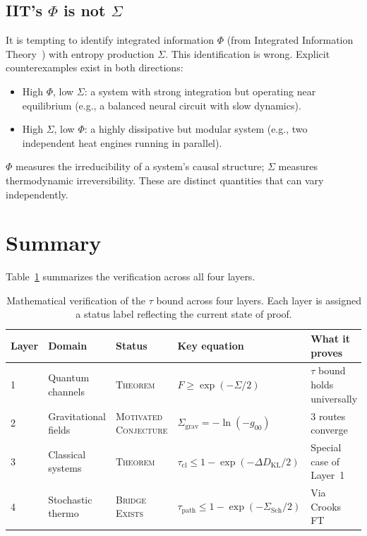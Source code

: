 \documentclass[prl,twocolumn,superscriptaddress,longbibliography,floatfix]{revtex4-2}
\newcommand{\tauasym}{\tau}
\begin{document}
\subsection{IIT's $\Phi$ is not $\Sigma$}

It is tempting to identify integrated information $\Phi$
(from Integrated Information Theory~\cite{Tononi2008}) with
entropy production $\Sigma$. This identification is wrong.
Explicit counterexamples exist in both directions:
\begin{itemize}
\item High $\Phi$, low $\Sigma$: a system with strong integration
but operating near equilibrium (e.g., a balanced neural circuit
with slow dynamics).
\item High $\Sigma$, low $\Phi$: a highly dissipative but modular
system (e.g., two independent heat engines running in parallel).
\end{itemize}
$\Phi$ measures the irreducibility of a system's causal structure;
$\Sigma$ measures thermodynamic irreversibility. These are distinct
quantities that can vary independently.

\section{Summary}
\label{sec:summary}

Table~\ref{tab:summary} summarizes the verification across all four
layers.

\begin{table}[t]
\caption{Mathematical verification of the $\tauasym$ bound across
four layers. Each layer is assigned a status label reflecting the
current state of proof.}
\label{tab:summary}
\begin{ruledtabular}
\begin{tabular}{lllll}
\textbf{Layer} & \textbf{Domain} & \textbf{Status}
& \textbf{Key equation} & \textbf{What it proves} \\
\hline
1 & Quantum channels
& \textsc{Theorem}
& $F \geq \exp(-\Sigma/2)$
& $\tauasym$ bound holds universally \\
2 & Gravitational fields
& \textsc{Motivated Conjecture}
& $\Sigma_{\text{grav}} = -\ln(-g_{00})$
& 3 routes converge \\
3 & Classical systems
& \textsc{Theorem}
& $\tauasym_{\text{cl}} \leq 1 - \exp(-\Delta D_{\mathrm{KL}}/2)$
& Special case of Layer~1 \\
4 & Stochastic thermo
& \textsc{Bridge Exists}
& $\tauasym_{\text{path}} \leq 1 - \exp(-\Sigma_{\text{Sch}}/2)$
& Via Crooks FT \\
\end{tabular}
\end{ruledtabular}
\end{table}
\end{document}
